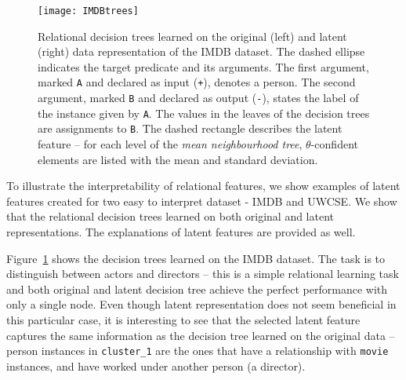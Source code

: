 


\begin{figure}[t]
	\centering
	\medskip
    \texttt{[image: IMDBtrees]}
    \caption{Relational decision trees learned on the original (left) and latent (right) data representation of the IMDB dataset. The dashed ellipse indicates the target predicate and its arguments. The first argument, marked \texttt{A} and declared as input (\texttt{+}), denotes a person. The second argument, marked \texttt{B} and declared as output (\texttt{-}), states the label of the instance given by \texttt{A}. The values in the leaves of the decision trees are assignments to \texttt{B}. The dashed rectangle describes the latent feature -- for each level of the \textit{mean neighbourhood tree}, $\theta$-confident elements are listed with the mean and standard deviation.  }
    \label{fig:IMDBtree}
\end{figure}



To illustrate the interpretability of relational features, we show examples of latent features created for two easy to interpret dataset - IMDB and UWCSE.
We show that the relational decision trees  learned on both original and latent representations.
The explanations of latent features are provided as well.



Figure~\ref{fig:IMDBtree} shows the decision trees learned on the IMDB dataset.
The task is to distinguish between actors and directors -- this is a simple relational learning task and both original and latent decision tree achieve the perfect performance with only a single node.
Even though latent representation does not seem beneficial in this particular case, it is interesting to see that the selected latent feature captures the same information as the decision tree learned on the original data -- person instances in \texttt{cluster\_1} are the ones that have a relationship with \texttt{movie} instances, and have worked under another person (a director).



